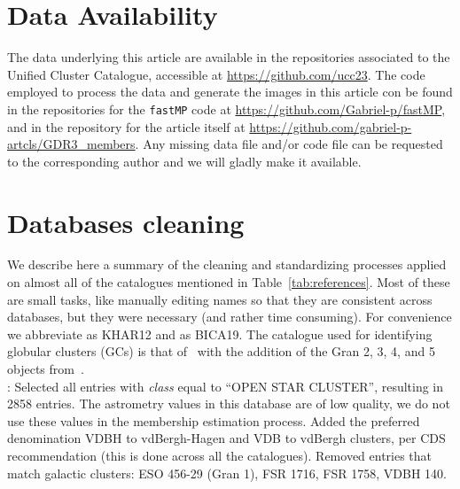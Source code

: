 \documentclass[fleqn,usenatbib]{mnras}
\begin{document}
\section*{Data Availability}
 
The data underlying this article are available in the repositories associated to
the Unified Cluster Catalogue, accessible at \url{https://github.com/ucc23}.
The code employed to process the data and generate the images in this article
con be found in the repositories for the \texttt{fastMP} code at 
\url{https://github.com/Gabriel-p/fastMP}, and in the repository for the article
itself at \url{https://github.com/gabriel-p-artcls/GDR3_members}. Any missing
data file and/or code file can be requested to the corresponding author and we
will gladly make it available.













\appendix

\section{Databases cleaning}
\label{app:db_cleaning}

We describe here a summary of the cleaning and standardizing processes applied
on almost all of the catalogues mentioned in Table~\ref{tab:references}. Most of
these are small tasks, like manually editing names so that they are
consistent across databases, but they were necessary (and rather time
consuming). For convenience we abbreviate \cite{Kharchenko_2012} as KHAR12 and
\cite{Bica_2019} as BICA19.
The catalogue used for identifying globular clusters (GCs) is that
of~\cite{Vasiliev_2021} with the addition of the Gran 2, 3, 4, and 5 objects
from~\cite{Gran_2022}.\\

\noindent\cite{Kharchenko_2012}: Selected all entries with \emph{class} equal to
``OPEN STAR CLUSTER'', resulting in 2858 entries. The astrometry values in this
database are of low quality, we do not use these values in the
membership estimation process.
Added the preferred denomination VDBH to vdBergh-Hagen and VDB to vdBergh
clusters, per CDS recommendation (this is done across all the catalogues).
Removed entries that match galactic clusters: ESO 456-29 (Gran 1), FSR 1716,
FSR 1758, VDBH 140.\\
\end{document}

